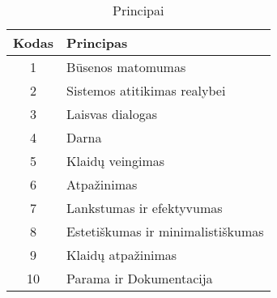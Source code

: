 	\begin{table}[h] 
		\caption{Principai} %
		\centering %
		\begin{tabular}{c l} %
			\hline\hline %
			Kodas & Principas\\ [0.5pt] %
			\hline %
			1 & Būsenos matomumas \\
			2 & Sistemos atitikimas realybei \\
			3 & Laisvas dialogas \\
			4 & Darna \\
			5 & Klaidų veingimas \\
			6 & Atpažinimas \\
			7 & Lankstumas ir efektyvumas \\
			8 & Estetiškumas ir minimalistiškumas \\
			9 & Klaidų atpažinimas \\
			10 & Parama ir Dokumentacija \\
			\hline %
		\end{tabular} 
		\label{table:principai} %
	\end{table} 

